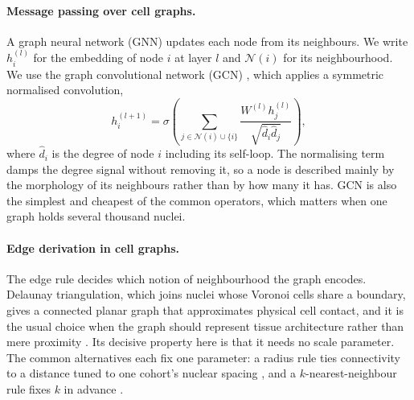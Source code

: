 \documentclass{midl} %
\begin{document}
\paragraph{Message passing over cell graphs.}
A graph neural network (GNN) updates each node from its neighbours. We write $h^{(l)}_i$ for the
embedding of node $i$ at layer $l$ and $\mathcal{N}(i)$ for its neighbourhood. We use the graph
convolutional network (GCN) \citep{kipf2017}, which applies a symmetric normalised convolution,
\begin{equation}
\label{eq:gcn}
h^{(l+1)}_{i} = \sigma\!\left( \sum_{j \in \mathcal{N}(i) \cup \{i\}}
\frac{W^{(l)} h^{(l)}_{j}}{\sqrt{\hat{d}_i \hat{d}_j}} \right),
\end{equation}
where $\hat{d}_i$ is the degree of node $i$ including its self-loop. The normalising term
damps the degree signal without removing it, so a node is described mainly by the morphology
of its neighbours rather than by how many it has. GCN is also the simplest and cheapest of the
common operators, which matters when one graph holds several thousand nuclei.

\paragraph{Edge derivation in cell graphs.}
The edge rule decides which notion of neighbourhood the graph encodes. Delaunay triangulation,
which joins nuclei whose Voronoi cells share a boundary, gives a connected planar graph that
approximates physical cell contact, and it is the usual choice when the graph should represent
tissue architecture rather than mere proximity \citep{gunduz2004, lu2022}. Its decisive property
here is that it needs no scale parameter. The common alternatives each fix one parameter: a radius rule
ties connectivity to a distance tuned to one cohort's nuclear spacing \citep{pati2022}, and a
$k$-nearest-neighbour rule fixes $k$ in advance \citep{zhou2019}.
\end{document}
